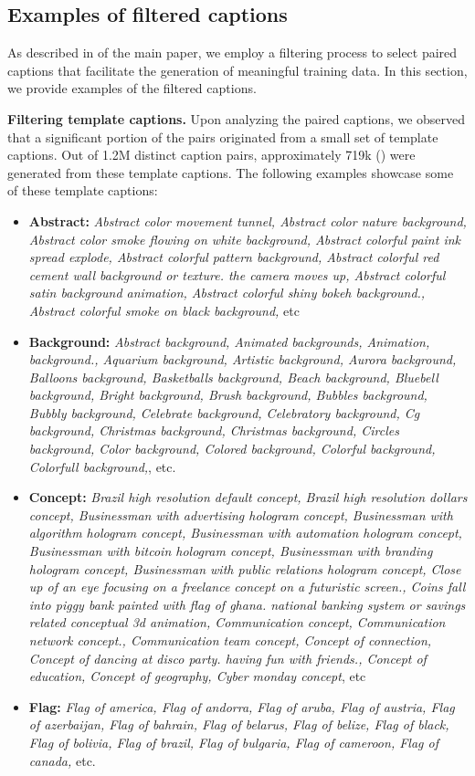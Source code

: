\subsection{Examples of filtered captions}
\label{app:subsec:qualitative_filtering}
As described in 
\if{} \fi
of the main paper,
we employ a filtering process to select paired captions 
that facilitate the generation of meaningful training data.
In this section, we provide examples of the filtered captions.

\noindent\textbf{Filtering template captions.} 
Upon analyzing the paired captions, 
we observed that a significant portion of the pairs originated 
from a small set of template captions. 
Out of 1.2M distinct caption pairs, 
approximately 719k () were generated from these template captions. 
The following examples showcase some of these template captions:

\begin{itemize}
    \item \textbf{Abstract:} \textit{Abstract color movement tunnel, Abstract color nature background, Abstract color smoke flowing on white background, Abstract colorful paint ink spread explode, Abstract colorful pattern background, Abstract colorful red cement wall background or texture. the camera moves up, Abstract colorful satin background animation, Abstract colorful shiny bokeh background., Abstract colorful smoke on black background,} etc
    \item \textbf{Background:} \textit{Abstract background, Animated backgrounds, Animation, background., Aquarium background, Artistic background, Aurora background, Balloons background, Basketballs background, Beach background, Bluebell background, Bright background, Brush background, Bubbles background, Bubbly background, Celebrate background, Celebratory background, Cg background, Christmas background, Christmas background, Circles background, Color background, Colored background, Colorful background, Colorfull background,}, etc.
    \item \textbf{Concept:} \textit{Brazil high resolution default concept, Brazil high resolution dollars concept, Businessman with advertising hologram concept, Businessman with algorithm hologram concept, Businessman with automation hologram concept, Businessman with bitcoin hologram concept, Businessman with branding hologram concept, Businessman with public relations hologram concept, Close up of an eye focusing on a freelance concept on a futuristic screen., Coins fall into piggy bank painted with flag of ghana. national banking system or savings related conceptual 3d animation, Communication concept, Communication network concept., Communication team concept, Concept of connection, Concept of dancing at disco party. having fun with friends., Concept of education, Concept of geography, Cyber monday concept}, etc 
    \item \textbf{Flag:} \textit{Flag of america, Flag of andorra, Flag of aruba, Flag of austria, Flag of azerbaijan, Flag of bahrain, Flag of belarus, Flag of belize, Flag of black, Flag of bolivia, Flag of brazil, Flag of bulgaria, Flag of cameroon, Flag of canada,} etc.
\end{itemize}

